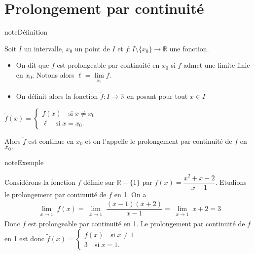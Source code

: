 \documentclass[letterpaper,10pt,french]{jupyterBook}
\begin{document}
\section{Prolongement par continuité}
\label{\detokenize{limitefcts:prolongement-par-continuite}}
\begin{sphinxadmonition}{note}{Définition}

\sphinxAtStartPar
Soit \(I\) un intervalle, \(x_0\) un point de \(I\) et \(f:I\setminus\{x_0\}\rightarrow\mathbb{R}\) une fonction.
\begin{itemize}
\item {} 
\sphinxAtStartPar
On dit que \(f\) est prolongeable par continuité en \(x_0\) si \(f\) admet une limite finie en \(x_0.\) Notons alors \(\ell=\lim\limits_{\substack{x_{0}}}f.\)

\item {} 
\sphinxAtStartPar
On définit alors la fonction \(\widetilde{f}:I\rightarrow\mathbb{R}\) en posant pour tout \(x\in I\)

\end{itemize}

\sphinxAtStartPar
\(\widetilde{f}(x)=\left\{
\begin{array}{ll}
f(x) \quad\mbox{si} \;x\neq x_0\\
\ell \quad\mbox{si}\;x=x_0.
\end{array}
\right.\)

\sphinxAtStartPar
Alors \(\widetilde{f}\) est continue en \(x_0\) et on l’appelle le prolongement par continuité de \(f\) en \(x_0.\)
\end{sphinxadmonition}

\begin{sphinxadmonition}{note}{Exemple}

\sphinxAtStartPar
Considérons la fonction \(f\) définie sur \(\mathbb{R}-\{1\}\) par \(f(x)=\dfrac{x^2+x-2}{x-1}.\) Etudions le prolongement par continuité de \(f\) en 1. On a
\begin{equation*}
\begin{split}
\lim\limits_{\substack{x\rightarrow1}}f(x)=\lim\limits_{\substack{x\rightarrow1}}\dfrac{(x-1)(x+2)}{x-1}=\lim\limits_{\substack{x\rightarrow1}} x+2=3
\end{split}
\end{equation*}
\sphinxAtStartPar
Donc \(f\) est prolongeable par continuité en 1. Le prolongement par continuité de \(f\) en 1 est donc
\(\widetilde{f}(x)=\left\{
\begin{array}{ll}
f(x) \quad\mbox{si} \;x\neq 1\\
3 \quad\mbox{si}\;x=1.
\end{array}
\right.\)
\end{sphinxadmonition}
\end{document}
